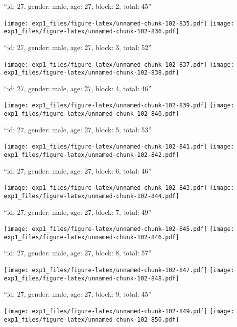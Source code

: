 \documentclass[11pt,,]{article}
\begin{document}
\newpage
[1] 

``id: 27, gender: male, age: 27, block: 2, total: 45''

\texttt{[image: exp1\_files/figure-latex/unnamed-chunk-102-835.pdf]}
\texttt{[image: exp1\_files/figure-latex/unnamed-chunk-102-836.pdf]}

\newpage
[1] 

``id: 27, gender: male, age: 27, block: 3, total: 52''

\texttt{[image: exp1\_files/figure-latex/unnamed-chunk-102-837.pdf]}
\texttt{[image: exp1\_files/figure-latex/unnamed-chunk-102-838.pdf]}

\newpage
[1] 

``id: 27, gender: male, age: 27, block: 4, total: 46''

\texttt{[image: exp1\_files/figure-latex/unnamed-chunk-102-839.pdf]}
\texttt{[image: exp1\_files/figure-latex/unnamed-chunk-102-840.pdf]}

\newpage
[1] 

``id: 27, gender: male, age: 27, block: 5, total: 53''

\texttt{[image: exp1\_files/figure-latex/unnamed-chunk-102-841.pdf]}
\texttt{[image: exp1\_files/figure-latex/unnamed-chunk-102-842.pdf]}

\newpage
[1] 

``id: 27, gender: male, age: 27, block: 6, total: 46''

\texttt{[image: exp1\_files/figure-latex/unnamed-chunk-102-843.pdf]}
\texttt{[image: exp1\_files/figure-latex/unnamed-chunk-102-844.pdf]}

\newpage
[1] 

``id: 27, gender: male, age: 27, block: 7, total: 49''

\texttt{[image: exp1\_files/figure-latex/unnamed-chunk-102-845.pdf]}
\texttt{[image: exp1\_files/figure-latex/unnamed-chunk-102-846.pdf]}

\newpage
[1] 

``id: 27, gender: male, age: 27, block: 8, total: 57''

\texttt{[image: exp1\_files/figure-latex/unnamed-chunk-102-847.pdf]}
\texttt{[image: exp1\_files/figure-latex/unnamed-chunk-102-848.pdf]}

\newpage
[1] 

``id: 27, gender: male, age: 27, block: 9, total: 45''

\texttt{[image: exp1\_files/figure-latex/unnamed-chunk-102-849.pdf]}
\texttt{[image: exp1\_files/figure-latex/unnamed-chunk-102-850.pdf]}
\end{document}
